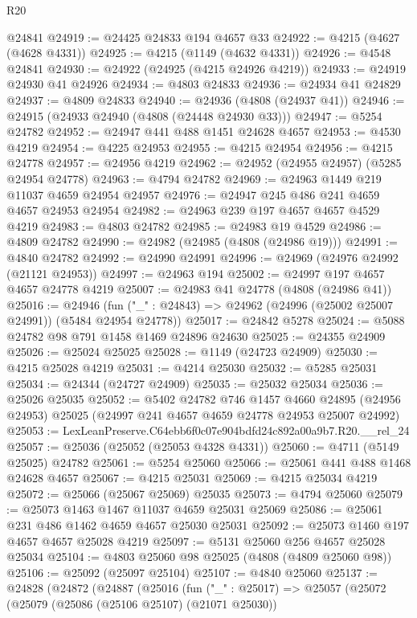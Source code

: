 \begin{lexlean}{R20}
\begin{coremodule}
    @24841
@24919 := @24425 @24833 @194 @4657 @33
@24922 := @4215 (@4627 (@4628 @4331))
@24925 := @4215 (@1149 (@4632 @4331))
@24926 := @4548 @24841
@24930 := @24922 (@24925 (@4215 @24926 @4219))
@24933 := @24919 @24930 @41 @24926
@24934 := @4803 @24833
@24936 := @24934 @41 @24829
@24937 := @4809 @24833
@24940 := @24936 (@4808 (@24937 @41))
@24946 := @24915 (@24933 @24940 (@4808 (@24448 @24930 @33)))
@24947 := @5254 @24782
@24952 := @24947 @441 @488 @1451 @24628 @4657
@24953 := @4530 @4219
@24954 := @4225 @24953
@24955 := @4215 @24954
@24956 := @4215 @24778
@24957 := @24956 @4219
@24962 := @24952 (@24955 @24957) (@5285 @24954 @24778)
@24963 := @4794 @24782
@24969 := @24963 @1449 @219 @11037 @4659 @24954 @24957
@24976 := @24947 @245 @486 @241 @4659 @4657 @24953 @24954
@24982 := @24963 @239 @197 @4657 @4657 @4529 @4219
@24983 := @4803 @24782
@24985 := @24983 @19 @4529
@24986 := @4809 @24782
@24990 := @24982 (@24985 (@4808 (@24986 @19)))
@24991 := @4840 @24782
@24992 := @24990 @24991
@24996 := @24969 (@24976 @24992 (@21121 @24953))
@24997 := @24963 @194
@25002 := @24997 @197 @4657 @4657 @24778 @4219
@25007 := @24983 @41 @24778 (@4808 (@24986 @41))
@25016 := @24946
    (fun ("_" : @24843) => @24962 (@24996 (@25002 @25007 @24991)) (@5484 @24954 @24778))
@25017 := @24842 @5278
@25024 := @5088 @24782 @98 @791 @1458 @1469 @24896 @24630
@25025 := @24355 @24909
@25026 := @25024 @25025
@25028 := @1149 (@24723 @24909)
@25030 := @4215 @25028 @4219
@25031 := @4214 @25030
@25032 := @5285 @25031
@25034 := @24344 (@24727 @24909)
@25035 := @25032 @25034
@25036 := @25026 @25035
@25052 := @5402
    @24782
    @746
    @1457
    @4660
    @24895
    (@24956 @24953)
    @25025
    (@24997 @241 @4657 @4659 @24778 @24953 @25007 @24992)
@25053 := LexLeanPreserve.C64ebb6f0c07e904bdfd24c892a00a9b7.R20.__rel_24
@25057 := @25036 (@25052 (@25053 @4328 @4331))
@25060 := @4711 (@5149 @25025) @24782
@25061 := @5254 @25060
@25066 := @25061 @441 @488 @1468 @24628 @4657
@25067 := @4215 @25031
@25069 := @4215 @25034 @4219
@25072 := @25066 (@25067 @25069) @25035
@25073 := @4794 @25060
@25079 := @25073 @1463 @1467 @11037 @4659 @25031 @25069
@25086 := @25061 @231 @486 @1462 @4659 @4657 @25030 @25031
@25092 := @25073 @1460 @197 @4657 @4657 @25028 @4219
@25097 := @5131 @25060 @256 @4657 @25028 @25034
@25104 := @4803 @25060 @98 @25025 (@4808 (@4809 @25060 @98))
@25106 := @25092 (@25097 @25104)
@25107 := @4840 @25060
@25137 := @24828
    (@24872
      (@24887
        (@25016
          (fun ("_" : @25017) =>
          @25057
            (@25072
              (@25079
                (@25086 (@25106 @25107) (@21071 @25030))

\end{coremodule}
\end{lexlean}
